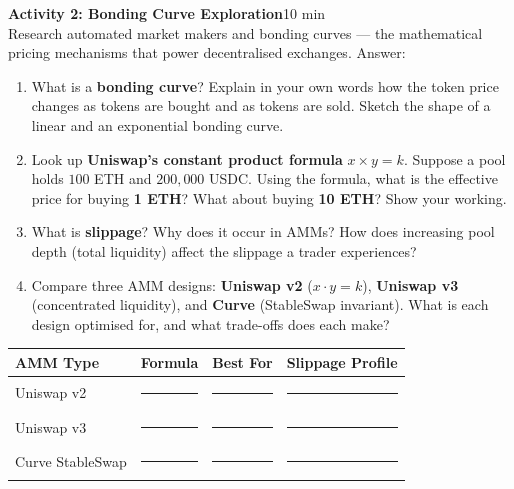 \documentclass[11pt,a4paper]{article}
\newcommand{\activitybox}[3]{%
  \noindent\colorbox{mllavender4}{\parbox{\dimexpr\linewidth-2\fboxsep}{%
    \textbf{\color{mlpurple}#1}\hfill\textcolor{mlgray}{\small #2}\\[2pt]#3%
  }}\par\vspace{4pt}%
}
\newcommand{\fillcell}{\rule{2.2cm}{0.3pt}}
\begin{document}
\vspace{2pt}

\activitybox{Activity 2: Bonding Curve Exploration}{10 min}{%
Research automated market makers and bonding curves --- the mathematical pricing mechanisms that power decentralised exchanges. Answer:
\begin{enumerate}
\item What is a \textbf{bonding curve}? Explain in your own words how the token price changes as tokens are bought and as tokens are sold. Sketch the shape of a linear and an exponential bonding curve.
\item Look up \textbf{Uniswap's constant product formula} $x \times y = k$. Suppose a pool holds $100$ ETH and $200{,}000$ USDC. Using the formula, what is the effective price for buying \textbf{1 ETH}? What about buying \textbf{10 ETH}? Show your working.
\item What is \textbf{slippage}? Why does it occur in AMMs? How does increasing pool depth (total liquidity) affect the slippage a trader experiences?
\item Compare three AMM designs: \textbf{Uniswap v2} ($x \cdot y = k$), \textbf{Uniswap v3} (concentrated liquidity), and \textbf{Curve} (StableSwap invariant). What is each design optimised for, and what trade-offs does each make?
\end{enumerate}
\vspace{4pt}
{\footnotesize\renewcommand{\arraystretch}{1.35}%
\setlength{\tabcolsep}{5pt}%
\begin{tabular}{@{}p{3.0cm}p{3.2cm}p{3.0cm}p{3.4cm}@{}}
\toprule
\textbf{AMM Type} & \textbf{Formula} & \textbf{Best For} & \textbf{Slippage Profile} \\
\midrule
Uniswap v2       & \fillcell & \fillcell & \fillcell \\
Uniswap v3       & \fillcell & \fillcell & \fillcell \\
Curve StableSwap & \fillcell & \fillcell & \fillcell \\
\bottomrule
\end{tabular}}
\vspace{2pt}
}

\vspace{2pt}
\end{document}
